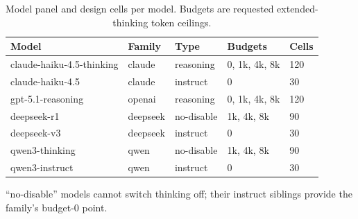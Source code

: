 \begin{table}[!t]
\centering
\caption{Model panel and design cells per model. Budgets are requested extended-thinking token ceilings.}
\label{tab:design}
\footnotesize
\setlength{\tabcolsep}{3.5pt}
\begin{tabular}{lllll}
\hline
Model & Family & Type & Budgets & Cells \\
\hline
claude-haiku-4.5-thinking & claude & reasoning & 0, 1k, 4k, 8k & 120 \\
claude-haiku-4.5 & claude & instruct & 0 & 30 \\
gpt-5.1-reasoning & openai & reasoning & 0, 1k, 4k, 8k & 120 \\
deepseek-r1 & deepseek & no-disable & 1k, 4k, 8k & 90 \\
deepseek-v3 & deepseek & instruct & 0 & 30 \\
qwen3-thinking & qwen & no-disable & 1k, 4k, 8k & 90 \\
qwen3-instruct & qwen & instruct & 0 & 30 \\
\hline
\end{tabular}
\par\smallskip\footnotesize ``no-disable'' models cannot switch thinking off; their instruct siblings provide the family's budget-0 point.
\end{table}
